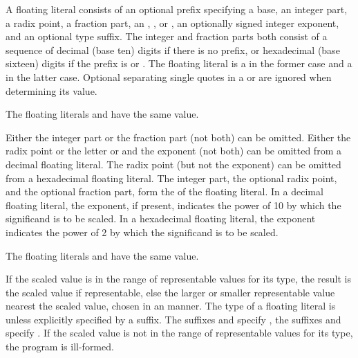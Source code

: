 \pnum
{}%
A floating literal consists of
an optional prefix specifying a base,
an integer part,
a radix point,
a fraction part,
%
%
%
%
an , ,  or ,
an optionally signed integer exponent, and
an optional type suffix.
The integer and fraction parts both consist of
a sequence of decimal (base ten) digits if there is no prefix, or
hexadecimal (base sixteen) digits if the prefix is  or .
The floating literal is a  in the former case and
a  in the latter case.
Optional separating single quotes in
a  or 
are ignored when determining its value.
\begin{example} The floating literals  and 
have the same value. \end{example}
Either the integer part or the fraction part (not both) can be omitted.
Either the radix point or the letter  or  and
the exponent (not both) can be omitted from a decimal floating literal.
The radix point (but not the exponent) can be omitted
from a hexadecimal floating literal.
The integer part, the optional radix point, and the optional fraction part,
form the  of the floating literal.
In a decimal floating literal, the exponent, if present,
indicates the power of 10 by which the significand is to be scaled.
In a hexadecimal floating literal, the exponent
indicates the power of 2 by which the significand is to be scaled.
\begin{example}
The floating literals  and  have the same value.
\end{example}
If the scaled value is in
the range of representable values for its type, the result is the scaled
value if representable, else the larger or smaller representable value
nearest the scaled value, chosen in an  manner.
%
The type of a floating literal is 
%
unless explicitly specified by a suffix.
%
%
%
The suffixes  and  specify ,
%
%
%
the suffixes  and  specify 
. If the scaled value is not in the range of representable
values for its type, the program is ill-formed.

